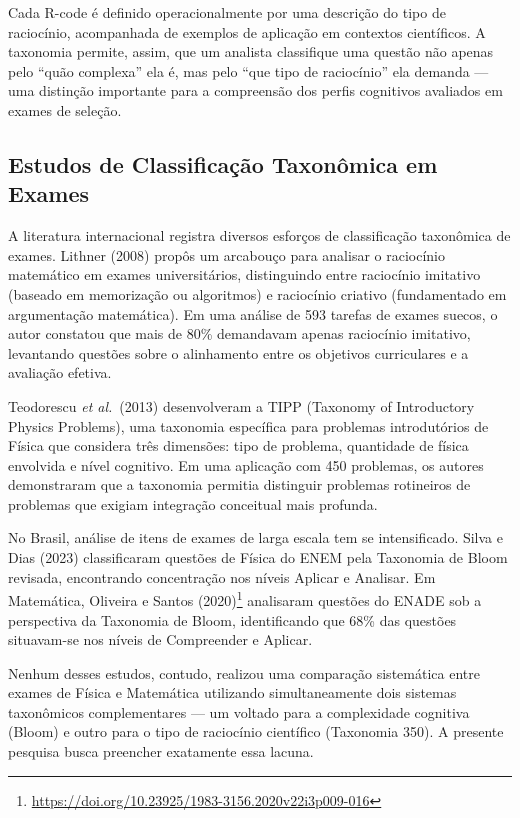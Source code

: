 \documentclass[
  12pt,
  a4paper,
  twoside,
  brazilian
]{article}
\begin{document}
Cada R-code é definido operacionalmente por uma descrição do tipo de
raciocínio, acompanhada de exemplos de aplicação em contextos
científicos. A taxonomia permite, assim, que um analista classifique uma
questão não apenas pelo ``quão complexa'' ela é, mas pelo ``que tipo de
raciocínio'' ela demanda --- uma distinção importante para a compreensão
dos perfis cognitivos avaliados em exames de seleção.

\subsection{Estudos de Classificação Taxonômica em
Exames}\label{estudos-de-classificauxe7uxe3o-taxonuxf4mica-em-exames}

A literatura internacional registra diversos esforços de classificação
taxonômica de exames. Lithner (2008) propôs um arcabouço para analisar o
raciocínio matemático em exames universitários, distinguindo entre
raciocínio imitativo (baseado em memorização ou algoritmos) e raciocínio
criativo (fundamentado em argumentação matemática). Em uma análise de
593 tarefas de exames suecos, o autor constatou que mais de 80\%
demandavam apenas raciocínio imitativo, levantando questões sobre o
alinhamento entre os objetivos curriculares e a avaliação efetiva.

Teodorescu \textit{et al.}~(2013) desenvolveram a TIPP (Taxonomy of Introductory
Physics Problems), uma taxonomia específica para problemas introdutórios
de Física que considera três dimensões: tipo de problema, quantidade de
física envolvida e nível cognitivo. Em uma aplicação com 450 problemas,
os autores demonstraram que a taxonomia permitia distinguir problemas
rotineiros de problemas que exigiam integração conceitual mais profunda.

No Brasil, análise de itens de exames de larga escala tem se
intensificado. Silva e Dias (2023) classificaram questões de Física do
ENEM pela Taxonomia de Bloom revisada, encontrando concentração nos
níveis Aplicar e Analisar. Em Matemática, Oliveira e Santos (2020)\footnote{\url{https://doi.org/10.23925/1983-3156.2020v22i3p009-016}}
analisaram questões do ENADE sob a perspectiva da Taxonomia de Bloom,
identificando que 68\% das questões situavam-se nos níveis de
Compreender e Aplicar.

Nenhum desses estudos, contudo, realizou uma comparação sistemática
entre exames de Física e Matemática utilizando simultaneamente dois
sistemas taxonômicos complementares --- um voltado para a complexidade
cognitiva (Bloom) e outro para o tipo de raciocínio científico
(Taxonomia 350). A presente pesquisa busca preencher exatamente essa
lacuna.
\end{document}
